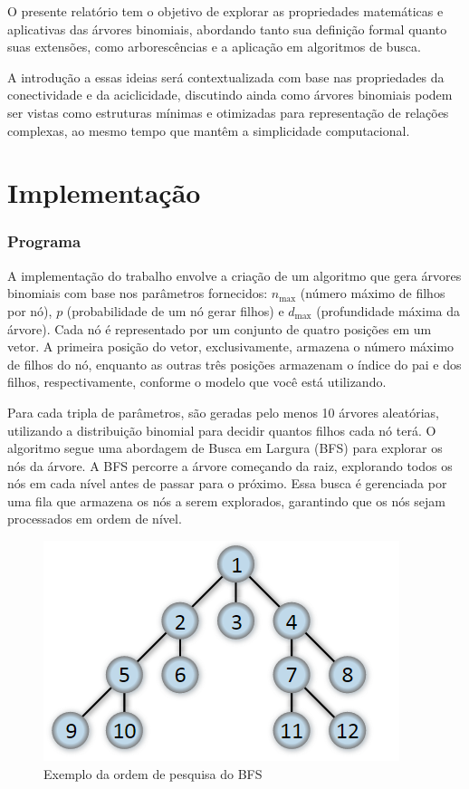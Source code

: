 \documentclass[12pt, a4paper]{scrreprt}
\begin{document}
O presente relatório tem o objetivo de explorar as propriedades matemáticas e aplicativas das árvores binomiais, abordando tanto sua definição formal quanto suas extensões, como arborescências e a aplicação em algoritmos de busca.

A introdução a essas ideias será contextualizada com base nas propriedades da conectividade e da aciclicidade, discutindo ainda como árvores binomiais podem ser vistas como estruturas mínimas e otimizadas para representação de relações complexas, ao mesmo tempo que mantêm a simplicidade computacional.

\chapter{Implementação}
\subsection*{Programa}

A implementação do trabalho envolve a criação de um algoritmo que gera árvores binomiais com base nos parâmetros fornecidos: \( n_{\text{max}} \) (número máximo de filhos por nó), \( p \) (probabilidade de um nó gerar filhos) e \( d_{\text{max}} \) (profundidade máxima da árvore). Cada nó é representado por um conjunto de quatro posições em um vetor. A primeira posição do vetor, exclusivamente, armazena o número máximo de filhos do nó, enquanto as outras três posições armazenam o índice do pai e dos filhos, respectivamente, conforme o modelo que você está utilizando.

Para cada tripla de parâmetros, são geradas pelo menos 10 árvores aleatórias, utilizando a distribuição binomial para decidir quantos filhos cada nó terá. O algoritmo segue uma abordagem de Busca em Largura (BFS) para explorar os nós da árvore. A BFS percorre a árvore começando da raiz, explorando todos os nós em cada nível antes de passar para o próximo. Essa busca é gerenciada por uma fila que armazena os nós a serem explorados, garantindo que os nós sejam processados em ordem de nível.

\vfill
\begin{figure}[h]
    \centering
    \includegraphics[width=.75\textwidth]{src/BFS.png}
    \caption{Exemplo da ordem de pesquisa do BFS}
    \label{fig:BFS}
\end{figure}
\vfill
\end{document}
